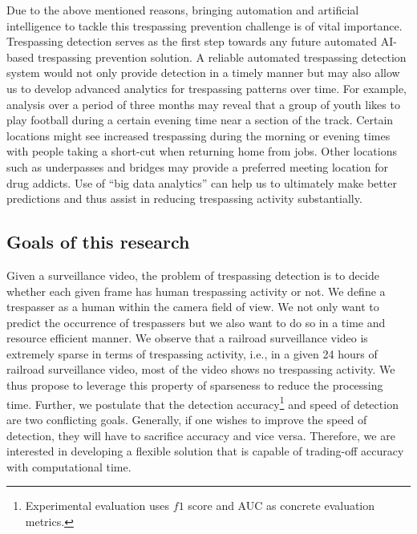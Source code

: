 Due to the above mentioned reasons, bringing automation and artificial intelligence to tackle this trespassing prevention challenge is of vital importance. Trespassing detection serves as the first step towards any future automated AI-based trespassing prevention solution. A reliable automated trespassing detection system would not only provide detection in a timely manner but may also allow us to develop advanced analytics for trespassing patterns over time. For example, analysis over a period of three months may reveal that a group of youth likes to play football during a certain evening time near a section of the track. Certain locations might see increased trespassing during the morning or evening times with people taking a short-cut when returning home from jobs. Other locations such as underpasses and bridges may provide a preferred meeting location for drug addicts. Use of ``big data analytics'' can help us to ultimately make better predictions and thus assist in reducing trespassing activity substantially.
\subsection{Goals of this research}
\label{sec:goal}
Given a surveillance video, the problem of trespassing detection is to decide whether each given frame has human trespassing activity or not. We define a trespasser as a human within the camera field of view. We not only want to predict the occurrence of trespassers but we also want to do so in a time and resource efficient manner. We observe that a railroad surveillance video is extremely sparse in terms of trespassing activity, i.e., in a given 24 hours of railroad surveillance video, most of the video shows no trespassing activity. We thus propose to leverage this property of sparseness to reduce the processing time. 
Further, we postulate that the detection accuracy\footnote{Experimental evaluation uses $f1$ score and AUC as concrete evaluation metrics.} and speed of detection are two conflicting goals. Generally, if one wishes to improve the speed of detection, they will have to sacrifice accuracy and vice versa. Therefore, we are interested in developing a  flexible solution that is capable of trading-off accuracy with computational time.

